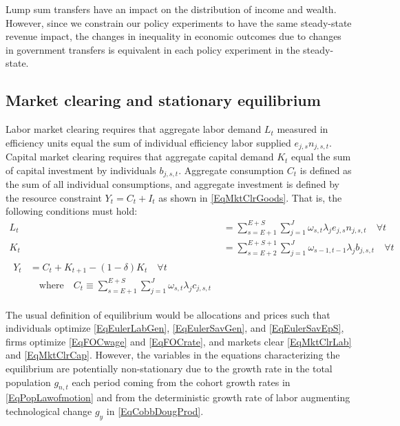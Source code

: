 \documentclass[letterpaper,12pt]{article}
\theoremstyle{definition}
\begin{document}
\begin{spacing}{1.5}
    Lump sum transfers have an impact on the distribution of income and wealth. However, since we constrain our policy experiments to have the same steady-state revenue impact, the changes in inequality in economic outcomes due to changes in government transfers is equivalent in each policy experiment in the steady-state.


  \subsection{Market clearing and stationary equilibrium}\label{SecMCEqlbm}

    Labor market clearing requires that aggregate labor demand $L_t$ measured in efficiency units equal the sum of individual efficiency labor supplied $e_{j,s}n_{j,s,t}$. Capital market clearing requires that aggregate capital demand $K_t$ equal the sum of capital investment by individuals $b_{j,s,t}$. Aggregate consumption $C_t$ is defined as the sum of all individual consumptions, and aggregate investment is defined by the resource constraint $Y_t = C_t + I_t$ as shown in \eqref{EqMktClrGoods}. That is, the following conditions must hold:
    \begin{align}
      L_t &= \sum_{s=E+1}^{E+S}\sum_{j=1}^{J} \omega_{s,t}\lambda_j e_{j,s}n_{j,s,t} \quad \forall t \label{EqMktClrLab} \\
      K_t &= \sum_{s=E+2}^{E+S+1}\sum_{j=1}^{J}\omega_{s-1,t-1}\lambda_j b_{j,s,t}  \quad \forall t \label{EqMktClrCap} \\
      \begin{split}
        Y_t &= C_t + K_{t+1} - (1-\delta)K_t \quad\forall t \\
        &\quad\text{where}\quad C_t \equiv \sum_{s=E+1}^{E+S}\sum_{j=1}^{J}\omega_{s,t}\lambda_j c_{j,s,t}
      \end{split} \label{EqMktClrGoods}
    \end{align}

    The usual definition of equilibrium would be allocations and prices such that individuals optimize \eqref{EqEulerLabGen}, \eqref{EqEulerSavGen}, and \eqref{EqEulerSavEpS}, firms optimize \eqref{EqFOCwage} and \eqref{EqFOCrate}, and markets clear \eqref{EqMktClrLab} and \eqref{EqMktClrCap}. However, the variables in the equations characterizing the equilibrium are potentially non-stationary due to the growth rate in the total population $g_{n,t}$ each period coming from the cohort growth rates in \eqref{EqPopLawofmotion} and from the deterministic growth rate of labor augmenting technological change $g_y$ in \eqref{EqCobbDougProd}.


\end{spacing}
\end{document}
